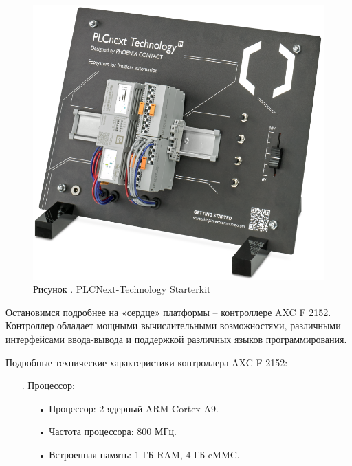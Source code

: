 {	\begin{figure}[H]
		\centering
		\def\svgwidth{\textwidth}
		\includegraphics[scale=0.7]{images/pclnext_x.png}
		\caption*{\gostFont Рисунок \thechaptercntr .\theimagecntr \spc {--} PLCNext-Technology Starterkit}
		\label{fig:ACXF2152}
	\end{figure}  \addtocounter{imagecntr}{1}

	\par \redline Остановимся подробнее на «сердце» платформы {--} контроллере AXC F 2152. Контроллер обладает мощными вычислительными возможностями, различными интерфейсами ввода-вывода и поддержкой различных языков программирования.

	\par \redline Подробные технические характеристики контроллера AXC F 2152:

	\begin{itemize}[leftmargin=2.15cm, labelwidth=0.65cm, labelsep=0.0cm] 

		\item[\theitemcntr. ] Процессор:
			\begin{itemize}[leftmargin=1.5cm, labelwidth=0.65cm, labelsep=0.0cm] 
				\item[•] Процессор: 2-ядерный ARM Cortex-A9.
				\item[•] Частота процессора: 800 МГц.
				\item[•] Встроенная память: 1 ГБ RAM, 4 ГБ eMMC.
			\end{itemize} \addtocounter{itemcntr}{1}


\end{itemize}}
